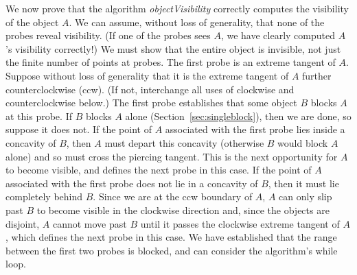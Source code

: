 \documentclass[10pt,twocolumn]{article}
\begin{document}
We now prove that the algorithm {\em objectVisibility} correctly computes 
the visibility of the object $A$.
We can assume, without loss of generality, that none of the probes reveal visibility.
(If one of the probes sees $A$, we have clearly computed $A$'s visibility correctly!)
We must show that the entire object is invisible, not just the finite number of points
at probes.
The first probe is an extreme tangent of $A$.
Suppose without loss of generality that it is the extreme tangent of $A$ further
counterclockwise (ccw). 
(If not, interchange all uses of clockwise and counterclockwise below.)
The first probe establishes that some object $B$ blocks $A$ at this probe.
If $B$ blocks $A$ alone (Section~\ref{sec:singleblock}), then we are done, 
so suppose it does not.
If the point of $A$ associated with the first probe lies inside a concavity of $B$, 
then $A$ must depart this concavity (otherwise $B$ would block $A$ alone) 
and so must cross the piercing tangent.
This is the next opportunity for $A$ to become visible, and defines the next probe in this
case.
If the point of $A$ associated with the first probe does not lie in a concavity of $B$,
then it must lie completely behind $B$.
Since we are at the ccw boundary of $A$, $A$ can only slip past $B$ to become visible
in the clockwise direction and, since the objects are disjoint, 
$A$ cannot move past $B$ until it passes the clockwise extreme tangent of $A$,
which defines the next probe in this case.
We have established that the range between the first two probes is blocked,
and can consider the algorithm's while loop.
\end{document}
